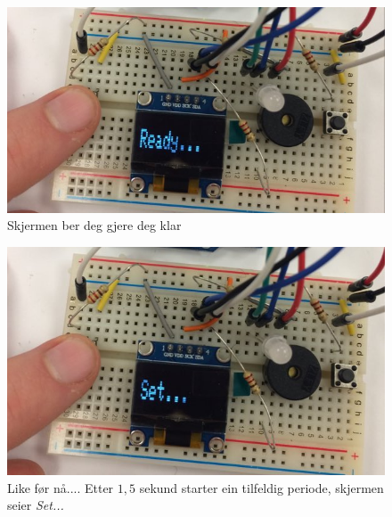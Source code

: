 \documentclass[journal]{IEEEtran}
\begin{document}
  \begin{figure}[!h]
    \begin{center}
      \includegraphics[scale=0.2]{03_ready}
      \caption{Skjermen ber deg gjere deg klar}
    \end{center}
  \end{figure}
  \begin{figure}[!h]
    \begin{center}
      \includegraphics[scale=0.2]{03_set}
      \caption{Like før nå....  Etter $1,5$ sekund starter ein tilfeldig
      periode, skjermen seier \textit{Set...}}
    \end{center}
  \end{figure}
\end{document}
